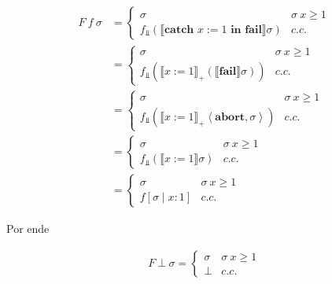 \documentclass[article, 12pt]{article}
\begin{document}
\begin{align*}
  F ~ f ~ \sigma 
  &= \begin{cases}
    \sigma & \sigma ~ x \geq 1 \\ 
    f_{\Bot}(\llbracket \textbf{catch } x:= 1 \textbf{ in fail}\rrbracket
    \sigma) & c.c.
  \end{cases} \\
  &=\begin{cases}
    \sigma & \sigma ~ x \geq 1 \\ 
    f_{\Bot}( \llbracket x := 1 \rrbracket_+ \left( \llbracket \textbf{fail}
  \rrbracket\sigma \right)  ) & c.c.
  \end{cases} \\ 
  &=\begin{cases}
    \sigma & \sigma ~ x \geq 1 \\ 
    f_{\Bot}( \llbracket x := 1 \rrbracket_+  \left<\textbf{abort}, \sigma \right>  ) & c.c.
  \end{cases}\\
  &=\begin{cases}
    \sigma & \sigma ~ x \geq 1 \\ 
    f_{\Bot} \left( \llbracket x:= 1 \rrbracket \sigma \right)  & c.c.
  \end{cases}\\ 
  &=\begin{cases}
    \sigma & \sigma ~ x \geq 1 \\ 
    f[\sigma \mid x : 1]  & c.c.
  \end{cases}
\end{align*}

Por ende 

\begin{align*}
  F ~ \bot ~ \sigma = \begin{cases}
    \sigma & \sigma ~ x \geq 1 \\ 
    \bot & c.c.
  \end{cases}
\end{align*}
\end{document}
